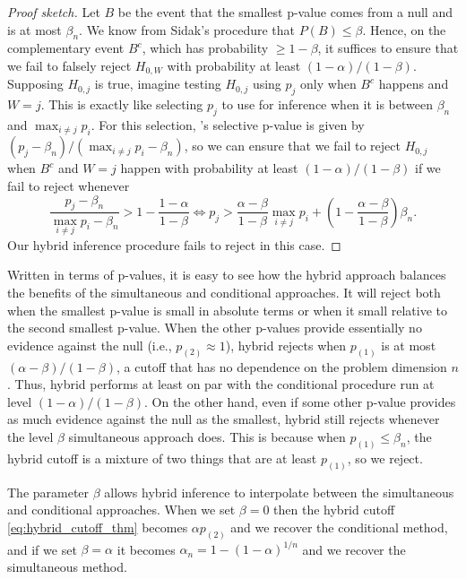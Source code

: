 \documentclass{article}
\begin{document}
\begin{proof}[Proof sketch]    
    Let $B$ be the event that the smallest p-value comes from a null and is at most $\beta_n$. We know from Sidak's procedure that $P(B) \leq \beta$. Hence, on the complementary event $B^c$, which has probability $\geq 1-\beta$, it suffices to ensure that we fail to falsely reject $H_{0, W}$ with probability at least $(1-\alpha)/(1-\beta)$. Supposing $H_{0, j}$ is true, imagine testing $H_{0, j}$ using $p_j$ only when $B^c$ happens and $W=j$. This is exactly like selecting $p_j$ to use for inference when it is between $\beta_n$ and $\max_{i \neq j} p_i $. For this selection, 's selective p-value is given by $(p_j - \beta_n)/(\max_{i \neq j} p_i  - \beta_n)$, so we can ensure that we fail to reject $H_{0, j}$ when $B^c$ and $W=j$ happen with probability at least $(1-\alpha)/(1-\beta)$ if we fail to reject whenever
    \begin{equation*}
        \frac{p_j - \beta_n}{\max_{i \neq j} p_i  - \beta_n} > 1 - \frac{1-\alpha}{1-\beta} \iff p_j > \frac{\alpha-\beta}{1-\beta} \max_{i \neq j} p_i + \left(1 - \frac{\alpha-\beta}{1-\beta}\right)\beta_n.
    \end{equation*}
    Our hybrid inference procedure fails to reject in this case.  
\end{proof}

Written in terms of p-values, it is easy to see how the hybrid approach balances the benefits of the simultaneous and conditional approaches. It will reject both when the smallest p-value is small in absolute terms or when it small relative to the second smallest p-value. When the other p-values provide essentially no evidence against the null (i.e., $p_{(2)} \approx 1$), hybrid rejects when $p_{(1)}$ is at most $(\alpha-\beta)/(1-\beta)$, a cutoff that has no dependence on the problem dimension $n$. Thus, hybrid performs at least on par with the conditional procedure run at level $(1-\alpha)/(1-\beta)$. On the other hand, even if some other p-value provides as much evidence against the null as the smallest, hybrid still rejects whenever the level $\beta$ simultaneous approach does. This is because when $p_{(1)} \leq \beta_n$, the hybrid cutoff is a mixture of two things that are at least $p_{(1)}$, so we reject. 

The parameter $\beta$ allows hybrid inference to interpolate between the simultaneous and conditional approaches. When we set $\beta = 0$ then the hybrid cutoff \eqref{eq:hybrid_cutoff_thm} becomes $\alpha p_{(2)}$ and we recover the conditional method, and if we set $\beta=\alpha$ it becomes $\alpha_n = 1 - (1-\alpha)^{1/n}$ and we recover the simultaneous method. 
\end{document}
